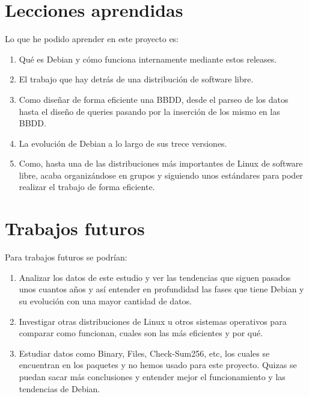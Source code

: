 \documentclass[a4paper, 12pt]{book}
\begin{document}
\section{Lecciones aprendidas}
\label{sec:lecciones_aprendidas}

Lo que he podido aprender en este proyecto es:

\begin{enumerate}
  \item Qué es Debian y cómo funciona internamente mediante estos releases.
  \item El trabajo que hay detrás de una distribución de software libre.
  \item Como diseñar de forma eficiente una BBDD, desde el parseo de los datos hasta el diseño de queries pasando por la inserción de los mismo en las BBDD.
  \item La evolución de Debian a lo largo de sus trece versiones.
  \item Como, hasta una de las distribuciones más importantes de Linux de software libre, acaba organizándose en grupos y siguiendo unos estándares para poder realizar el trabajo de forma eficiente.
\end{enumerate}


\section{Trabajos futuros}
\label{sec:trabajos_futuros}

Para trabajos futuros se podrían:

\begin{enumerate}
	\item Analizar los datos de este estudio y ver las tendencias que siguen pasados unos cuantos años y así entender en profundidad las fases que tiene Debian y su evolución con una mayor cantidad de datos.
	
	\item Investigar otras distribuciones de Linux u otros sistemas operativos para comparar como funcionan, cuales son las más eficientes y por qué.
	
	\item Estudiar datos como Binary, Files, Check-Sum256, etc, los cuales se encuentran en los paquetes y no hemos usado para este proyecto. Quizas se puedan sacar más conclusiones y entender mejor el funcionamiento y las tendencias de Debian.
\end{enumerate}
\end{document}
